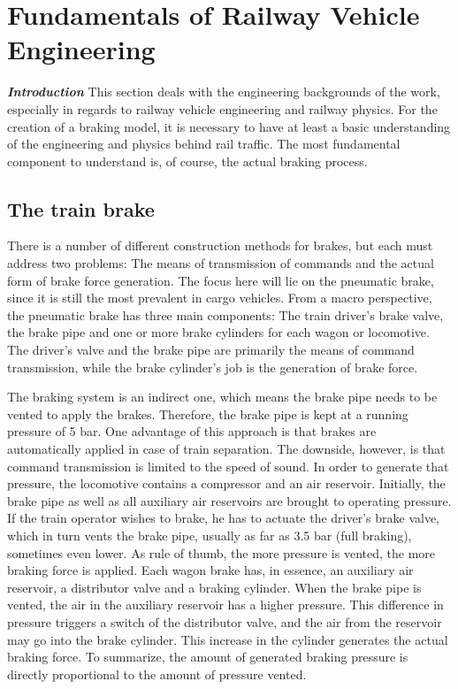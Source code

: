 \chapter{Fundamentals of Railway Vehicle Engineering}
\label{chap:FundamentalsOfRailwayVehicleEngineering}
\par\noindent
\emph{\textbf{Introduction}} This section deals with the engineering backgrounds of the work, especially in regards to railway vehicle engineering and railway physics. 
For the creation of a braking model, it is necessary to have at least a basic understanding of the engineering and physics behind rail traffic. The most fundamental component to understand is, of course, the actual braking process.

\section{The train brake}
\label{sec:TrainBrake}
\par\noindent
There is a number of different construction methods for brakes, but each must address two problems: The means of transmission of commands and the actual form of brake force generation. The focus here will lie on the pneumatic brake, since it is still the most prevalent in cargo vehicles. From a macro perspective, the pneumatic brake has three main components: The train driver's brake valve, the brake pipe and one or more brake cylinders for each wagon or locomotive. The driver's valve and the brake pipe are primarily the means of command transmission, while the brake cylinder's job is the generation of brake force. 

\par
The braking system is an indirect one, which means the brake pipe needs to be vented to apply the brakes. Therefore, the brake pipe is kept at a running pressure of 5 bar. One advantage of this approach is that brakes are automatically applied in case of train separation. The downside, however, is that command transmission is limited to the speed of sound. In order to generate that pressure, the locomotive contains a compressor and an air reservoir. Initially, the brake pipe as well as all auxiliary air reservoirs are brought to operating pressure. If the train operator wishes to brake, he has to actuate the driver's brake valve, which in turn vents the brake pipe, usually as far as 3.5 bar (full braking), sometimes even lower. As rule of thumb, the more pressure is vented, the more braking force is applied. Each wagon brake has, in essence, an auxiliary air reservoir, a distributor valve and a braking cylinder. When the brake pipe is vented, the air in the auxiliary reservoir has a higher pressure. This difference in pressure triggers a switch of the distributor valve, and the air from the reservoir may go into the brake cylinder. This increase in the cylinder generates the actual braking force. To summarize, the amount of generated braking pressure is directly proportional to the amount of pressure vented.

